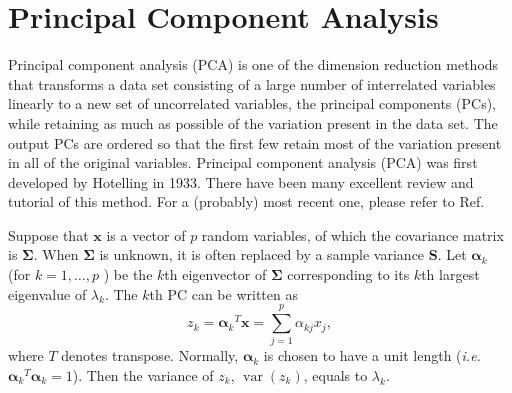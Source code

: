 \section{Principal Component Analysis\label{Sec:DR:PCA}}
Principal component analysis (PCA) is one of the dimension reduction methods that transforms a data set consisting of a large number of interrelated variables linearly to a new set of uncorrelated variables, the principal components (PCs), while retaining as much as possible of the variation present in the data set. The output PCs are ordered so that the first few retain most of the variation present in all of the original variables. Principal component analysis (PCA) was first developed by Hotelling in 1933.\cite{HotellingJEP1933} There have been many excellent review and tutorial of this method. For a (probably) most recent one, please refer to Ref.~\cite{GreenacreNRMP2022}


Suppose that $\mathbf{x}$ is a vector of $p$ random variables, of which the covariance matrix is $\boldsymbol{\Sigma}$. When $\boldsymbol{\Sigma}$ is unknown, it is often replaced by a sample variance $\mathbf{S}$. Let $\boldsymbol{\alpha}_k$ (for $k=1,\dots, p$ ) be the $k$th eigenvector of $\boldsymbol{\Sigma}$ corresponding to its $k$th largest eigenvalue of $\lambda_k$. The $k$th PC can be written as
\begin{equation}
	z_k={\boldsymbol{\alpha}_k}^T \mathbf{x}=\sum_{j=1}^p \alpha_{kj}x_j,
\end{equation}
where $T$ denotes transpose. Normally, $\boldsymbol{\alpha}_k$ is chosen to have a unit length (\textit{i.e.} ${\boldsymbol{\alpha}_k}^T\boldsymbol{\alpha}_k=1$). Then the variance of $z_k$, $\operatorname{var}(z_k)$, equals to $\lambda_k$.

